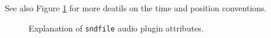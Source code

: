 See also Figure \ref{fig:ap_sndfile} for more deatils on the time and position conventions.

\begin{figure}[htb]
    \centering
    \caption{Explanation of {\tt sndfile} audio plugin attributes.}
    \label{fig:ap_sndfile}
\end{figure}

